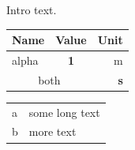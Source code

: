\documentclass{article}
\begin{document}
Intro text.
\begin{tabular}{l>{\bfseries}cr}
\toprule
Name & Value & Unit \\
\midrule
alpha & 1 & m \\
\multicolumn{2}{c}{both} & s \\
\bottomrule
\end{tabular}

\begin{tabularx}{\linewidth}{lX}
a & some long text \\
b & more text \\
\end{tabularx}
\end{document}

